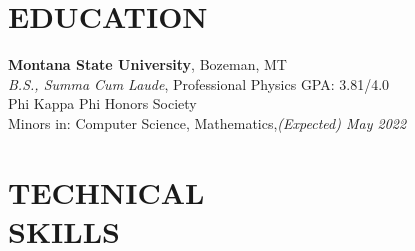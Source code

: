 \documentclass[margin]{res}
\begin{document}
\begin{resume}

\section{EDUCATION}
\raggedright
\textbf{Montana State University}, Bozeman, MT\\\vspace{0.5ex}
{\sl B.S., Summa Cum Laude}, Professional Physics \hfill GPA: 3.81/4.0\\
Phi Kappa Phi Honors Society\\
Minors in: Computer Science, Mathematics,\hfill {\sl (Expected) May 2022}


%

\section{TECHNICAL\\SKILLS}


\end{resume}
\end{document}
